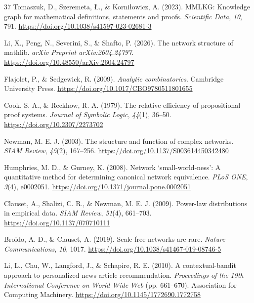 \documentclass[pdflatex,sn-basic,Numbered]{sn-jnl}
\begin{document}
\begin{thebibliography}{37}
 Tomaszuk, D., Szeremeta, \L{}., \& Korni\l{}owicz, A. (2023). MMLKG: Knowledge graph for mathematical definitions, statements and proofs. \emph{Scientific Data}, \emph{10}, 791. \url{https://doi.org/10.1038/s41597-023-02681-3}

 Li, X., Peng, N., Severini, S., \& Shafto, P. (2026). The network structure of mathlib. \emph{arXiv Preprint arXiv:2604.24797}. \url{https://doi.org/10.48550/arXiv.2604.24797}

 Flajolet, P., \& Sedgewick, R. (2009). \emph{Analytic combinatorics}. Cambridge University Press. \url{https://doi.org/10.1017/CBO9780511801655}

 Cook, S. A., \& Reckhow, R. A. (1979). The relative efficiency of propositional proof systems. \emph{Journal of Symbolic Logic}, \emph{44}(1), 36--50. \url{https://doi.org/10.2307/2273702}

 Newman, M. E. J. (2003). The structure and function of complex networks. \emph{SIAM Review}, \emph{45}(2), 167--256. \url{https://doi.org/10.1137/S003614450342480}

 Humphries, M. D., \& Gurney, K. (2008). Network `small-world-ness': A quantitative method for determining canonical network equivalence. \emph{PLoS ONE}, \emph{3}(4), e0002051. \url{https://doi.org/10.1371/journal.pone.0002051}

 Clauset, A., Shalizi, C. R., \& Newman, M. E. J. (2009). Power-law distributions in empirical data. \emph{SIAM Review}, \emph{51}(4), 661--703. \url{https://doi.org/10.1137/070710111}

 Broido, A. D., \& Clauset, A. (2019). Scale-free networks are rare. \emph{Nature Communications}, \emph{10}, 1017. \url{https://doi.org/10.1038/s41467-019-08746-5}

 Li, L., Chu, W., Langford, J., \& Schapire, R. E. (2010). A contextual-bandit approach to personalized news article recommendation. \emph{Proceedings of the 19th International Conference on World Wide Web} (pp. 661--670). Association for Computing Machinery. \url{https://doi.org/10.1145/1772690.1772758}
\end{thebibliography}
\end{document}
